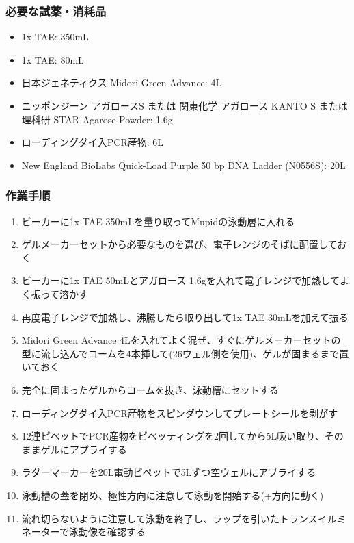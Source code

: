 \documentclass[titlepage,10pt,a4paper,uplatex]{jsbook}
\begin{document}
\subsubsection{必要な試薬・消耗品}
\begin{itemize}
\item 1x TAE: 350mL
\item 1x TAE: 80mL
\item 日本ジェネティクス Midori Green Advance: 4{\textmu}L
\item ニッポンジーン アガロースS または 関東化学 アガロース KANTO S または 理科研 STAR Agarose Powder: 1.6g
\item ローディングダイ入PCR産物: 6{\textmu}L
\item New England BioLabs Quick-Load Purple 50 bp DNA Ladder (N0556S): 20{\textmu}L
\end{itemize}

\subsubsection{作業手順}
\begin{enumerate}
\item ビーカーに1x TAE 350mLを量り取ってMupidの泳動層に入れる
\item ゲルメーカーセットから必要なものを選び、電子レンジのそばに配置しておく
\item ビーカーに1x TAE 50mLとアガロース 1.6gを入れて電子レンジで加熱してよく振って溶かす
\item 再度電子レンジで加熱し、沸騰したら取り出して1x TAE 30mLを加えて振る
\item Midori Green Advance 4{\textmu}Lを入れてよく混ぜ、すぐにゲルメーカーセットの型に流し込んでコームを4本挿して(26ウェル側を使用)、ゲルが固まるまで置いておく
\item 完全に固まったゲルからコームを抜き、泳動槽にセットする
\item ローディングダイ入PCR産物をスピンダウンしてプレートシールを剥がす
\item 12連ピペットでPCR産物をピペッティングを2回してから5{\textmu}L吸い取り、そのままゲルにアプライする
\item ラダーマーカーを20{\textmu}L電動ピペットで5{\textmu}Lずつ空ウェルにアプライする
\item 泳動槽の蓋を閉め、極性方向に注意して泳動を開始する(+方向に動く)
\item 流れ切らないように注意して泳動を終了し、ラップを引いたトランスイルミネーターで泳動像を確認する
\end{enumerate}
\end{document}
